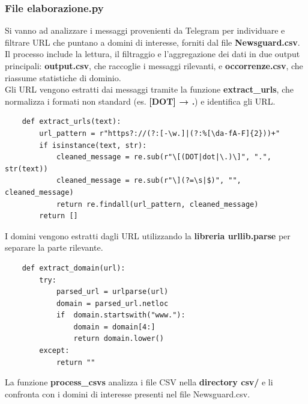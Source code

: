 \documentclass[12pt]{article}
\begin{document}
	\subsubsection{File elaborazione.py}
	Si vanno ad analizzare i messaggi provenienti da Telegram per individuare e filtrare URL che puntano a domini di interesse, forniti dal file \textbf{Newsguard.csv}.\\
	Il processo include la lettura, il filtraggio e l'aggregazione dei dati in due output principali: \textbf{output.csv}, che raccoglie i messaggi rilevanti, e \textbf{occorrenze.csv}, che riassume statistiche di dominio.\\
	Gli URL vengono estratti dai messaggi tramite la funzione \textbf{extract\_urls}, che normalizza i formati non standard (es. \textbf{[DOT] → .}) e identifica gli URL.
	\begin{lstlisting}
	def extract_urls(text):
		url_pattern = r"https?://(?:[-\w.]|(?:%[\da-fA-F]{2}))+"
		if isinstance(text, str):
			cleaned_message = re.sub(r"\[(DOT|dot|\.)\]", ".", str(text))
			cleaned_message = re.sub(r"\](?=\s|$)", "", cleaned_message)
			return re.findall(url_pattern, cleaned_message)
		return []
	\end{lstlisting}
	I domini vengono estratti dagli URL utilizzando la \textbf{libreria urllib.parse} per separare la parte rilevante.
	\begin{lstlisting}
	def extract_domain(url):
		try:
			parsed_url = urlparse(url)
			domain = parsed_url.netloc
			if 	domain.startswith("www."):
				domain = domain[4:]
				return domain.lower()
		except:
			return ""
	\end{lstlisting}
	La funzione\textbf{ process\_csvs} analizza i file CSV nella \textbf{directory csv/} e li confronta con i domini di interesse presenti nel file Newsguard.csv.
\end{document}
